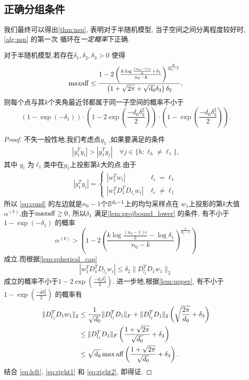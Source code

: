 \subsection{正确分组条件}
我们最终可以得出\autoref{thm:nsn}, 表明对于半随机模型, 
当子空间之间分离程度较好时,\autoref{alg:nsn} 的第一次
循环在\emph{一定概率}下正确.
\begin{theorem} \label{thm:nsn}
  对于半随机模型,若存在\(\delta_1, \delta_2, \delta_3 >0\) 使得
  \[\maff \le \frac{1-2\left( \frac{k\log \frac{(n_0-1)e}{k}+ \delta_1}
  {n_0-k} \right)^{\frac{2}{d_0-1}}}{\left( 1+\sqrt{2\pi}+\sqrt{d_0}\delta_3\right)\delta_2}, \]
  则每个点与其\(k\)个夹角最近邻都属于同一子空间的概率不小于
  \[
    \left(1-\exp(-\delta_1)\right)\cdot
    \left(1-2\exp\left(\frac{-d_0 \delta_2^2}{2}\right)\right) 
    \cdot\left(1-\exp\left(\frac{-d_0 \delta_3^2}{2}\right)\right).
  \]
\end{theorem}
\begin{proof}
  不失一般性地,我们考虑点\(y_1\) ,如果要满足的条件
  \begin{align}
    |y_1^T y_i|>|y_1^T y_j| \quad \forall j \in \{h:\ell_h \ne \ell_1\},
    \label{eq:cond}
  \end{align}
  其中 \(y_i\) 为\(\ell_1\)类中在\(y_1\)上投影第\(k\)大的点.由于
  \begin{align*}
    |y_1^T y_i|=
    \begin{cases}
      |w_1^T w_i| & \ell_i = \ell_1 \\
      |w_1^T D_1^T D_{\ell_i}w_i| & \ell_i \ne \ell_1
    \end{cases}
  \end{align*}
  所以 \eqref{eq:cond} 的左边就是\(n_0-1\)个\(\S^{d_0-1}\)上的均匀采样点在
  \(w_1\)上投影的第\(k\)大值\(\alpha^{(k)}\),由于\(\maff\ge 0\), 所以\(\delta_1\)
  满足\autoref{lem:projbound_lower} 的条件, 有不小于\(1-\exp(-\delta_1)\)
  的概率
  \begin{equation}
    \alpha^{(k)}>\left( 1-2\left(\frac{k\log \frac{(n_0-1)e}{k}-\log
  \delta_1}{n_0-k}
    \right)^{\frac{2}{d_0-1}}\right)
    \label{eq:left}
  \end{equation}
  成立.而根据\autoref{lem:spherical_cap} 
  \begin{equation} \label{eq:right1}
    |w_1^T D_1^T D_{l_j}w_i| \le \delta_2 \|D_{l_j}^T D_1 w_1\|_2
  \end{equation}
  成立的概率不小于\(1-2\exp(\frac{-d_0 \delta_2^2}{2})\).
  进一步地,根据\autoref{lem:upper}, 有不小于\(1-\exp(\frac{-d\delta_3^2}{2})\)
  的概率有
  \begin{align}
    \|D_{l_j}^T D_1 w_1\|_2 &\le \frac{1}{\sqrt{d_0}} \|D_{l_j}^TD_1\|_F +
    \|D_{l_j}^T D_1\|_2 \left( \sqrt{\frac{2\pi}{d_0}}+\delta_3 \right) \nonumber\\
    &\le \|D_{l_j}^TD_1\|_F \left(\frac{1+\sqrt{2\pi}}{\sqrt{d_0}}+\delta_3
    \right) \nonumber \\
    &\le \sqrt{d_0} \max \aff \left(\frac{1+\sqrt{2\pi}}{\sqrt{d_0}}+\delta_3
    \right).
    \label{eq:right2}
  \end{align}
  结合 \eqref{eq:left},  \eqref{eq:right1} 和 \eqref{eq:right2},  即得证.
\end{proof}

